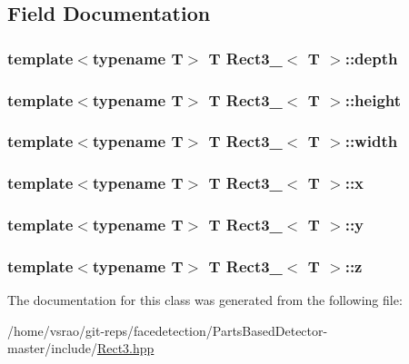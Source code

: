 \subsection{Field Documentation}
\hypertarget{classRect3___a73850e016f7e8152e47d430239c47cc2}{
\subsubsection[{depth}]{\setlength{\rightskip}{0pt plus 5cm}template$<$typename T$>$ T {\bf Rect3\-\_\-}$<$ T $>$\-::depth}}\label{classRect3___a73850e016f7e8152e47d430239c47cc2}
\hypertarget{classRect3___a4f10fdcf15fe8cdb6b01a9b90d56ebe5}{
\subsubsection[{height}]{\setlength{\rightskip}{0pt plus 5cm}template$<$typename T$>$ T {\bf Rect3\-\_\-}$<$ T $>$\-::height}}\label{classRect3___a4f10fdcf15fe8cdb6b01a9b90d56ebe5}
\hypertarget{classRect3___a780cbb24a81d6bbfff26c2ac6660beb8}{
\subsubsection[{width}]{\setlength{\rightskip}{0pt plus 5cm}template$<$typename T$>$ T {\bf Rect3\-\_\-}$<$ T $>$\-::width}}\label{classRect3___a780cbb24a81d6bbfff26c2ac6660beb8}
\hypertarget{classRect3___a035f211c0c365a9dbd15436cb5448e31}{
\subsubsection[{x}]{\setlength{\rightskip}{0pt plus 5cm}template$<$typename T$>$ T {\bf Rect3\-\_\-}$<$ T $>$\-::x}}\label{classRect3___a035f211c0c365a9dbd15436cb5448e31}
\hypertarget{classRect3___ab2c61e4e318bc064eb8bb707b699cbb6}{
\subsubsection[{y}]{\setlength{\rightskip}{0pt plus 5cm}template$<$typename T$>$ T {\bf Rect3\-\_\-}$<$ T $>$\-::y}}\label{classRect3___ab2c61e4e318bc064eb8bb707b699cbb6}
\hypertarget{classRect3___a99bae7d4f2bf0af6a3ffbfb0fa752b9e}{
\subsubsection[{z}]{\setlength{\rightskip}{0pt plus 5cm}template$<$typename T$>$ T {\bf Rect3\-\_\-}$<$ T $>$\-::z}}\label{classRect3___a99bae7d4f2bf0af6a3ffbfb0fa752b9e}


The documentation for this class was generated from the following file\-:\begin{DoxyCompactItemize}
\item 
/home/vsrao/git-\/reps/facedetection/\-Parts\-Based\-Detector-\/master/include/\hyperlink{Rect3_8hpp}{Rect3.\-hpp}\end{DoxyCompactItemize}
